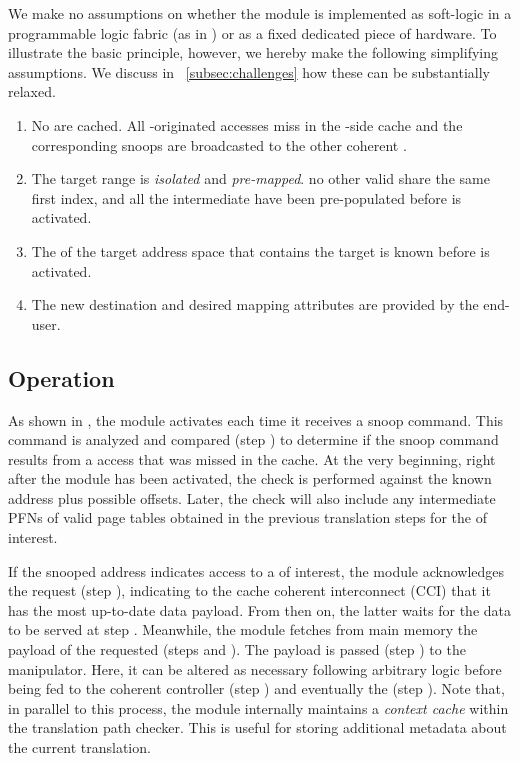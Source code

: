         We make no assumptions on whether the module is implemented as soft-logic in a programmable logic fabric (as in \cite{CAESAR}) or as a fixed dedicated piece of hardware. To illustrate the basic principle, however, we hereby make the following simplifying assumptions. We discuss in \sect~\ref{subsec:challenges} how these can be substantially relaxed.
        \begin{enumerate}
        
            \item No  are cached. All \mmu-originated accesses miss in the \pe-side cache and the corresponding snoops are broadcasted to the other coherent .
            \item The target \va range is \emph{isolated} and \emph{pre-mapped}. \Ie no other valid  share the same first index, and all the intermediate  have been pre-populated before \sname is activated.
            \item The \pgd of the target address space that contains the target  is known before \sname is activated.
            \item The new destination  and desired mapping attributes are provided by the end-user. %
        \end{enumerate}

    \subsection{\sname Operation}\label{sec:snv_op}


        As shown in , the \sname module activates each time it receives a snoop command.
        This command is analyzed and compared (step ) to determine if the snoop command results from a \pte access that was missed in the cache.
        At the very beginning, \ie right after the \sname module has been activated, the check is performed against the known \pgd address plus possible offsets. Later, the check will also include any intermediate PFNs of valid page tables obtained in the previous translation steps for the  of interest.
        
        If the snooped address indicates access to a \pte of interest, the \sname module acknowledges the request (step ), indicating to the cache coherent interconnect (CCI) that it has the most up-to-date data payload.
        From then on, the latter waits for the data to be served at step .
        Meanwhile, the \sname module fetches from main memory the payload of the requested \pte (steps  and ).
        The payload is passed (step ) to the  manipulator. Here, it can be altered as necessary following arbitrary logic before being fed to the coherent controller (step ) and eventually the \mmu (step ).
        Note that, in parallel to this process, the \sname module internally maintains a \emph{context cache} within the translation path checker. This is useful for storing additional metadata about the current translation.
        
